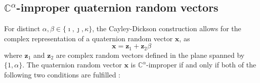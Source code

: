 \documentclass[review]{elsarticle}
\theoremstyle{plain}
\theoremstyle{remark}
\theoremstyle{plain}
\theoremstyle{definition}
\theoremstyle{prop}
\theoremstyle{definition}
\theoremstyle{plain}
\theoremstyle{plain}
\def \x {\mathbf{x}}
\begin{document}
\begin{appendices}
%
%
\section{$\mathbb{C}^\alpha$-improper quaternion random vectors}
For distinct $\alpha,\beta \in \{\imath,\jmath,\kappa\}$, the Cayley-Dickson construction allows for the complex representation of a quaternion random vector $\mathbf{x}$, as
\vspace{-1mm}\[\mathbf{x}=\mathbf{z}_1+\mathbf{z}_2\beta
\]
where $\mathbf{z}_1$ and $\mathbf{z}_2$ are complex random vectors defined in the plane spanned by $\{1,\alpha\}$. The quaternion random vector $\x$ is $\mathbb{C}^\alpha$-improper if and only if both of the following two conditions are fulfilled \cite{Amblard2004}:
 

\end{appendices}
\end{document}
